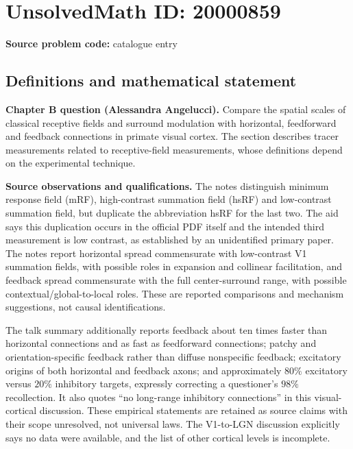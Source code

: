 \documentclass[11pt]{article}
\begin{document}
\section*{UnsolvedMath ID: 20000859}
\textbf{Source problem code:} catalogue entry
\subsection{Definitions and mathematical statement}
\textbf{Chapter B question (Alessandra Angelucci).} Compare the spatial scales of classical receptive fields and surround modulation with horizontal, feedforward and feedback connections in primate visual cortex. The section describes tracer measurements related to receptive-field measurements, whose definitions depend on the experimental technique.

\textbf{Source observations and qualifications.} The notes distinguish minimum response field (mRF), high-contrast summation field (hsRF) and low-contrast summation field, but duplicate the abbreviation hsRF for the last two. The aid says this duplication occurs in the official PDF itself and the intended third measurement is low contrast, as established by an unidentified primary paper. The notes report horizontal spread commensurate with low-contrast V1 summation fields, with possible roles in expansion and collinear facilitation, and feedback spread commensurate with the full center-surround range, with possible contextual/global-to-local roles. These are reported comparisons and mechanism suggestions, not causal identifications.

The talk summary additionally reports feedback about ten times faster than horizontal connections and as fast as feedforward connections; patchy and orientation-specific feedback rather than diffuse nonspecific feedback; excitatory origins of both horizontal and feedback axons; and approximately $80\%$ excitatory versus $20\%$ inhibitory targets, expressly correcting a questioner's $98\%$ recollection. It also quotes ``no long-range inhibitory connections'' in this visual-cortical discussion. These empirical statements are retained as source claims with their scope unresolved, not universal laws. The V1-to-LGN discussion explicitly says no data were available, and the list of other cortical levels is incomplete.
\end{document}
